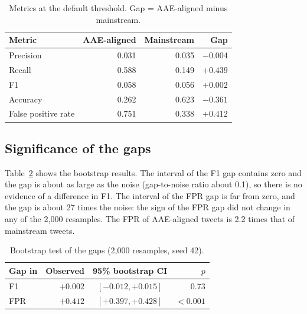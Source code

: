 \documentclass[runningheads,a4paper,oribibl]{llncs}
\begin{document}

\begin{table}
   \centering
   \begin{tabular}{|l|r|r|r|}
     \hline
     \textbf{Metric} & \textbf{AAE-aligned} & \textbf{Mainstream} & \textbf{Gap}\\
     \hline
     Precision & 0.031 & 0.035 & $-0.004$\\
     Recall & 0.588 & 0.149 & $+0.439$\\
     F1 & 0.058 & 0.056 & $+0.002$\\
     Accuracy & 0.262 & 0.623 & $-0.361$\\
     False positive rate & 0.751 & 0.338 & $+0.412$\\
     \hline
   \end{tabular}
   \caption{Metrics at the default threshold. Gap = AAE-aligned minus mainstream. \label{tab:metrics}}
\end{table}


\subsection{Significance of the gaps}
Table~\ref{tab:bootstrap} shows the bootstrap results. The interval of the F1 gap contains zero and the gap is about as large as the noise (gap-to-noise ratio about 0.1), so there is no evidence of a difference in F1. The interval of the FPR gap is far from zero, and the gap is about 27 times the noise: the sign of the FPR gap did not change in any of the 2,000 resamples. The FPR of AAE-aligned tweets is 2.2 times that of mainstream tweets.

\begin{table}
   \centering
   \begin{tabular}{|l|r|c|r|}
     \hline
     \textbf{Gap in} & \textbf{Observed} & \textbf{95\% bootstrap CI} & \textbf{$p$}\\
     \hline
     F1 & $+0.002$ & $[-0.012, +0.015]$ & 0.73\\
     FPR & $+0.412$ & $[+0.397, +0.428]$ & $<0.001$\\
     \hline
   \end{tabular}
   \caption{Bootstrap test of the gaps (2,000 resamples, seed 42).\label{tab:bootstrap}}
\end{table}
\end{document}
